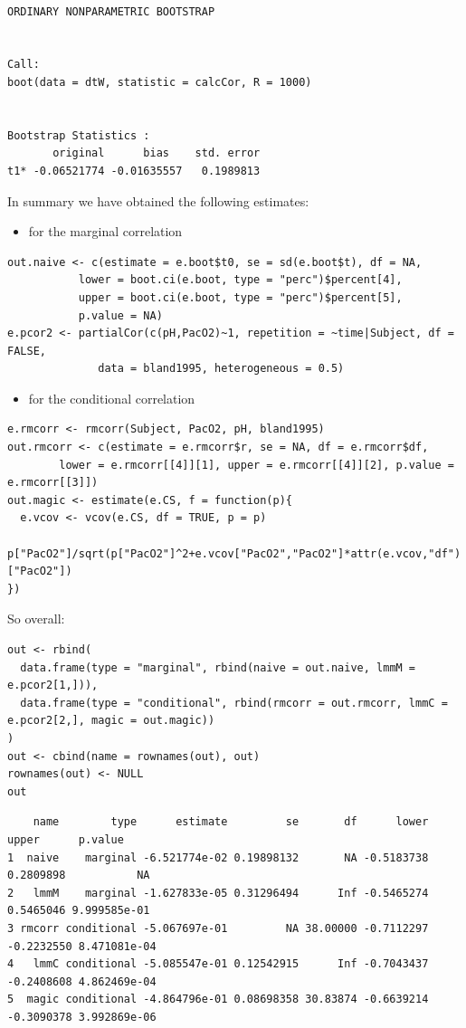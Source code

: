 \documentclass[12pt]{article}
\begin{document}
\begin{verbatim}

ORDINARY NONPARAMETRIC BOOTSTRAP


Call:
boot(data = dtW, statistic = calcCor, R = 1000)


Bootstrap Statistics :
       original      bias    std. error
t1* -0.06521774 -0.01635557   0.1989813
\end{verbatim}

In summary we have obtained the following estimates:
\begin{itemize}
\item for the marginal correlation
\end{itemize}
\lstset{language=r,label= ,caption= ,captionpos=b,numbers=none}
\begin{lstlisting}
out.naive <- c(estimate = e.boot$t0, se = sd(e.boot$t), df = NA,
	       lower = boot.ci(e.boot, type = "perc")$percent[4],
	       upper = boot.ci(e.boot, type = "perc")$percent[5],
	       p.value = NA)
e.pcor2 <- partialCor(c(pH,PacO2)~1, repetition = ~time|Subject, df = FALSE,
		      data = bland1995, heterogeneous = 0.5)
\end{lstlisting}

\begin{itemize}
\item for the conditional correlation
\end{itemize}
\lstset{language=r,label= ,caption= ,captionpos=b,numbers=none}
\begin{lstlisting}
e.rmcorr <- rmcorr(Subject, PacO2, pH, bland1995)
out.rmcorr <- c(estimate = e.rmcorr$r, se = NA, df = e.rmcorr$df,
		lower = e.rmcorr[[4]][1], upper = e.rmcorr[[4]][2], p.value = e.rmcorr[[3]])
out.magic <- estimate(e.CS, f = function(p){
  e.vcov <- vcov(e.CS, df = TRUE, p = p)
  p["PacO2"]/sqrt(p["PacO2"]^2+e.vcov["PacO2","PacO2"]*attr(e.vcov,"df")["PacO2"])
})
\end{lstlisting}

So overall:
\lstset{language=r,label= ,caption= ,captionpos=b,numbers=none}
\begin{lstlisting}
out <- rbind(
  data.frame(type = "marginal", rbind(naive = out.naive, lmmM = e.pcor2[1,])),
  data.frame(type = "conditional", rbind(rmcorr = out.rmcorr, lmmC = e.pcor2[2,], magic = out.magic))
)
out <- cbind(name = rownames(out), out)
rownames(out) <- NULL
out
\end{lstlisting}

\begin{verbatim}
    name        type      estimate         se       df      lower      upper      p.value
1  naive    marginal -6.521774e-02 0.19898132       NA -0.5183738  0.2809898           NA
2   lmmM    marginal -1.627833e-05 0.31296494      Inf -0.5465274  0.5465046 9.999585e-01
3 rmcorr conditional -5.067697e-01         NA 38.00000 -0.7112297 -0.2232550 8.471081e-04
4   lmmC conditional -5.085547e-01 0.12542915      Inf -0.7043437 -0.2408608 4.862469e-04
5  magic conditional -4.864796e-01 0.08698358 30.83874 -0.6639214 -0.3090378 3.992869e-06
\end{verbatim}
\end{document}
